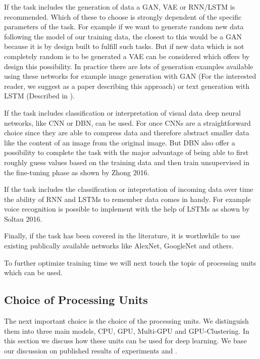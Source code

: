 \documentclass[conference]{IEEEtran}
\begin{document}
If the task includes the generation of data a GAN, VAE or RNN/LSTM is recommended. Which of these to choose is strongly dependent of the specific parameters of the task. For example if we want to generate random new data following the model of our training data, the closest to this would be a GAN because it is by design built to fulfill such tasks. But if new data which is not completely random is to be generated a VAE can be considered which offers by design this possibility. In practice there are lots of generation examples available using these networks for example image generation with GAN\cite{junyanz2017} (For the interested reader, we suggest \cite{zhu2016generative} as a paper describing this approach) or text generation with LSTM\cite{gittesttensorflow} (Described in \cite{sutskever2011generating}).

If the task includes classification or interpretation of visual data deep neural networks, like CNN or DBN, can be used. For once CNNs are a straightforward choice since they are able to compress data and therefore abstract smaller data like the content of an image from the original image. But DBN also offer a possibility to complete the task with the major advantage of being able to first roughly guess values based on the training data and then train unsupervised in the fine-tuning phase as shown by Zhong 2016\cite{zhong2016diversified}.

If the task includes the classification or intepretation of incoming data over time the ability of RNN and LSTMs to remember data comes in handy. For example voice recognition is possible to implement with the help of LSTMs as shown by Soltau 2016\cite{soltau2016neural}.

Finally, if the task has been covered in the literature, it is worthwhile to use existing publically available networks like AlexNet, GoogleNet and others.

To further optimize training time we will next touch the topic of processing units which can be used.





\subsection{Choice of Processing Units}
The next important choice is the choice of the processing units. We distinguish them into three main models, CPU, GPU, Multi-GPU and GPU-Clustering. In this section we discuss how these units can be used for deep learning. We base our discussion on published results of experiments \cite{shi2016benchmarking} and \cite{sastre2017scalability}. 
\end{document}
